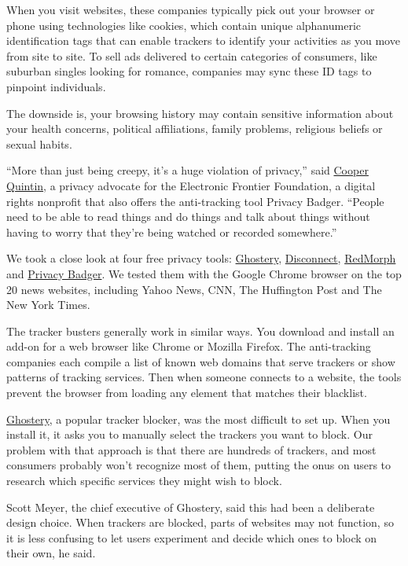 When you visit websites, these companies typically pick out your browser
or phone using technologies like cookies, which contain unique
alphanumeric identification tags that can enable trackers to identify
your activities as you move from site to site. To sell ads delivered to
certain categories of consumers, like suburban singles looking for
romance, companies may sync these ID tags to pinpoint individuals.

The downside is, your browsing history may contain sensitive information
about your health concerns, political affiliations, family problems,
religious beliefs or sexual habits.

``More than just being creepy, it's a huge violation of privacy,'' said
\href{https://www.eff.org/about/staff/cooper-quintin}{Cooper Quintin}, a
privacy advocate for the Electronic Frontier Foundation, a digital
rights nonprofit that also offers the anti-tracking tool Privacy Badger.
``People need to be able to read things and do things and talk about
things without having to worry that they're being watched or recorded
somewhere.''

We took a close look at four free privacy tools:
\href{https://www.ghostery.com/}{Ghostery},
\href{https://disconnect.me/}{Disconnect},
\href{https://redmorph.com/}{RedMorph} and
\href{https://www.eff.org/privacybadger}{Privacy Badger}. We tested them
with the Google Chrome browser on the top 20 news websites, including
Yahoo News, CNN, The Huffington Post and The New York Times.

The tracker busters generally work in similar ways. You download and
install an add-on for a web browser like Chrome or Mozilla Firefox. The
anti-tracking companies each compile a list of known web domains that
serve trackers or show patterns of tracking services. Then when someone
connects to a website, the tools prevent the browser from loading any
element that matches their blacklist.

\href{https://www.ghostery.com/}{Ghostery}, a popular tracker blocker,
was the most difficult to set up. When you install it, it asks you to
manually select the trackers you want to block. Our problem with that
approach is that there are hundreds of trackers, and most consumers
probably won't recognize most of them, putting the onus on users to
research which specific services they might wish to block.

Scott Meyer, the chief executive of Ghostery, said this had been a
deliberate design choice. When trackers are blocked, parts of websites
may not function, so it is less confusing to let users experiment and
decide which ones to block on their own, he said.

